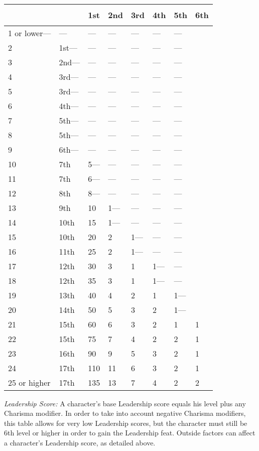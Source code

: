 \documentclass{article}
\begin{document}
\begin{tabular}{|>{\raggedright}p{56pt}|>{\raggedright}p{33pt}|>{\raggedright}p{19pt}|>{\raggedright}p{19pt}|>{\raggedright}p{19pt}|>{\raggedright}p{19pt}|>{\raggedright}p{19pt}|>{\raggedright}p{19pt}|}
\subsection*{} & \subsection*{} & 1\textbf{st} & 2\textbf{nd} & 3\textbf{rd} & 4\textbf{th} & 5\textbf{th} & 6\textbf{th}\tabularnewline
\hline
1 or lower--- & --- & --- & --- & --- & --- & --- & \tabularnewline
\hline
2 & 1st--- & --- & --- & --- & --- & --- & \tabularnewline
\hline
3 & 2nd--- & --- & --- & --- & --- & --- & \tabularnewline
\hline
4 & 3rd--- & --- & --- & --- & --- & --- & \tabularnewline
\hline
5 & 3rd--- & --- & --- & --- & --- & --- & \tabularnewline
\hline
6 & 4th--- & --- & --- & --- & --- & --- & \tabularnewline
\hline
7 & 5th--- & --- & --- & --- & --- & --- & \tabularnewline
\hline
8 & 5th--- & --- & --- & --- & --- & --- & \tabularnewline
\hline
9 & 6th--- & --- & --- & --- & --- & --- & \tabularnewline
\hline
10 & 7th & 5--- & --- & --- & --- & --- & \tabularnewline
\hline
11 & 7th & 6--- & --- & --- & --- & --- & \tabularnewline
\hline
12 & 8th & 8--- & --- & --- & --- & --- & \tabularnewline
\hline
13 & 9th & 10 & 1--- & --- & --- & --- & \tabularnewline
\hline
14 & 10th & 15 & 1--- & --- & --- & --- & \tabularnewline
\hline
15 & 10th & 20 & 2 & 1--- & --- & --- & \tabularnewline
\hline
16 & 11th & 25 & 2 & 1--- & --- & --- & \tabularnewline
\hline
17 & 12th & 30 & 3 & 1 & 1--- & --- & \tabularnewline
\hline
18 & 12th & 35 & 3 & 1 & 1--- & --- & \tabularnewline
\hline
19 & 13th & 40 & 4 & 2 & 1 & 1--- & \tabularnewline
\hline
20 & 14th & 50 & 5 & 3 & 2 & 1--- & \tabularnewline
\hline
21 & 15th & 60 & 6 & 3 & 2 & 1 & 1\tabularnewline
\hline
22 & 15th & 75 & 7 & 4 & 2 & 2 & 1\tabularnewline
\hline
23 & 16th & 90 & 9 & 5 & 3 & 2 & 1\tabularnewline
\hline
24 & 17th & 110 & 11 & 6 & 3 & 2 & 1\tabularnewline
\hline
25 or higher & 17th & 135 & 13 & 7 & 4 & 2 & 2\tabularnewline
\hline
\end{tabular}

\vspace{12pt}
\textit{Leadership Score: }A character's base Leadership score equals his level 
plus any Charisma modifier. In order to take into account negative Charisma modifiers, 
this table allows for very low Leadership scores, but the character must still 
be 6th level or higher in order to gain the Leadership feat. Outside factors can 
affect a character's Leadership score, as detailed above.
\end{document}
